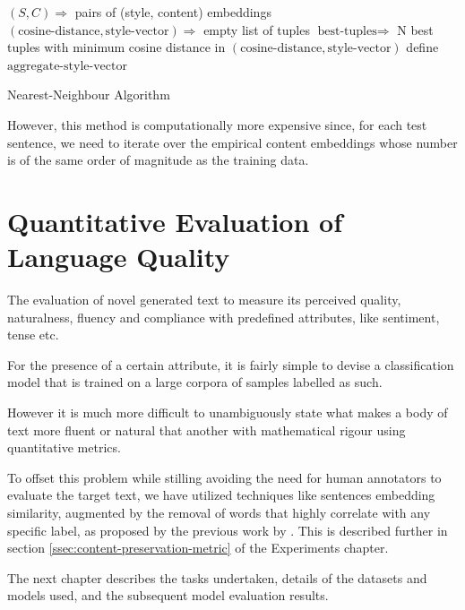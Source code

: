 \begin{algorithm}[H]
	$(S, C) \Rightarrow$ pairs of (style, content) embeddings\;
	$(\text{cosine-distance}, \text{style-vector}) \Rightarrow$ empty list of tuples\;
	$\text{best-tuples} \Rightarrow$ N best tuples with minimum cosine distance in $(\text{cosine-distance}, \text{style-vector})$\;
	define $\text{aggregate-style-vector}$\;
	\;

	\caption{\label{alg:nearest-neighbour} Nearest-Neighbour Algorithm}
\end{algorithm}

However, this method is computationally more expensive since, for each test sentence, we need to iterate over the empirical content embeddings whose number is of the same order of magnitude as the training data.

\section{Quantitative Evaluation of Language Quality}

The evaluation of novel generated text to measure its perceived quality, naturalness, fluency and compliance with predefined attributes, like sentiment, tense etc.

For the presence of a certain attribute, it is fairly simple to devise a classification model that is trained on a large corpora of samples labelled as such.

However it is much more difficult to unambiguously state what makes a body of text more fluent or natural that another with mathematical rigour using quantitative metrics.

To offset this problem while stilling avoiding the need for human annotators to evaluate the target text, we have utilized techniques like sentences embedding similarity, augmented by the removal of words that highly correlate with any specific label, as proposed by the previous work by \cite{fu2017style}. This is described further in section \ref{ssec:content-preservation-metric} of the Experiments chapter.


The next chapter describes the tasks undertaken, details of the datasets and models used, and the subsequent model evaluation results.

